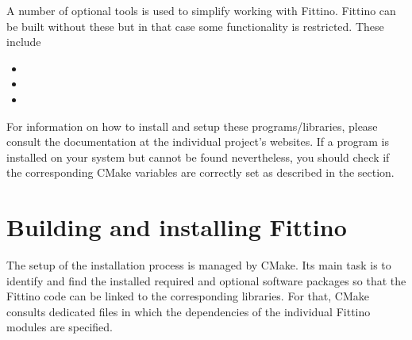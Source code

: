 \documentclass[letterpaper,10pt,english]{sphinxmanual}
\begin{document}
A number of optional tools is used to simplify working with Fittino. Fittino can be built without
these but in that case some functionality is restricted. These include
\begin{itemize}
\item {} 

\item {} 

\item {} 

\end{itemize}

For information on how to install and setup these programs/libraries, please consult the
documentation at the individual project's websites. If a program is installed on your system but
cannot be found nevertheless, you should check if the corresponding CMake variables are correctly
set as described in the {\hyperref[troubleshooting:troubleshooting]{\emph{}}} section.


\section{Building and installing Fittino}
\label{building::doc}\label{building:building-and-installing-fittino}
The setup of the installation process is managed by CMake. Its main task is to identify and find the
installed required and optional software packages so that the Fittino code can be linked to the
corresponding libraries. For that, CMake consults dedicated  files in which the
dependencies of the individual Fittino modules are specified.
\end{document}
